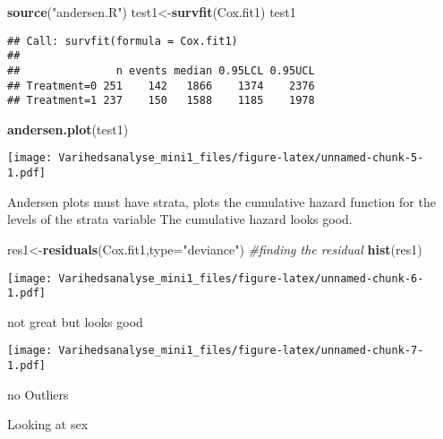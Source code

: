 \documentclass[
]{article}
\newenvironment{Shaded}{\begin{snugshade}}{\end{snugshade}}
\newcommand{\CommentTok}[1]{\textcolor[rgb]{0.56,0.35,0.01}{\textit{#1}}}
\newcommand{\DataTypeTok}[1]{\textcolor[rgb]{0.13,0.29,0.53}{#1}}
\newcommand{\KeywordTok}[1]{\textcolor[rgb]{0.13,0.29,0.53}{\textbf{#1}}}
\newcommand{\NormalTok}[1]{#1}
\newcommand{\OperatorTok}[1]{\textcolor[rgb]{0.81,0.36,0.00}{\textbf{#1}}}
\newcommand{\StringTok}[1]{\textcolor[rgb]{0.31,0.60,0.02}{#1}}
\begin{document}
\begin{Shaded}
\begin{Highlighting}[]
\KeywordTok{source}\NormalTok{(}\StringTok{"andersen.R"}\NormalTok{)}
\NormalTok{test1<-}\KeywordTok{survfit}\NormalTok{(Cox.fit1)}
\NormalTok{test1}
\end{Highlighting}
\end{Shaded}

\begin{verbatim}
## Call: survfit(formula = Cox.fit1)
## 
##               n events median 0.95LCL 0.95UCL
## Treatment=0 251    142   1866    1374    2376
## Treatment=1 237    150   1588    1185    1978
\end{verbatim}

\begin{Shaded}
\begin{Highlighting}[]
\KeywordTok{andersen.plot}\NormalTok{(test1)}
\end{Highlighting}
\end{Shaded}

\texttt{[image: Varihedsanalyse\_mini1\_files/figure-latex/unnamed-chunk-5-1.pdf]}

Andersen plots must have strata, plots the cumulative hazard function
for the levels of the strata variable The cumulative hazard looks good.

\begin{Shaded}
\begin{Highlighting}[]
\NormalTok{res1<-}\KeywordTok{residuals}\NormalTok{(Cox.fit1,}\DataTypeTok{type=}\StringTok{"deviance"}\NormalTok{) }\CommentTok{#finding the residual}
\KeywordTok{hist}\NormalTok{(res1)}
\end{Highlighting}
\end{Shaded}

\texttt{[image: Varihedsanalyse\_mini1\_files/figure-latex/unnamed-chunk-6-1.pdf]}

not great but looks good

\begin{Shaded}
\end{Shaded}

\texttt{[image: Varihedsanalyse\_mini1\_files/figure-latex/unnamed-chunk-7-1.pdf]}

no Outliers

Looking at sex
\end{document}
